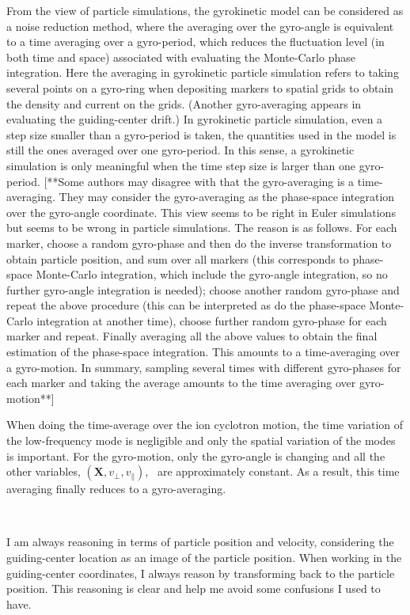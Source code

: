\documentclass{article}
\begin{document}
From the view of particle simulations, the gyrokinetic model can be
considered as a noise reduction method, where the averaging over the
gyro-angle is equivalent to a time averaging over a gyro-period, which reduces
the fluctuation level (in both time and space) associated with evaluating the
Monte-Carlo phase integration. Here the averaging in gyrokinetic particle
simulation refers to taking several points on a gyro-ring when depositing
markers to spatial grids to obtain the density and current on the grids.
(Another gyro-averaging appears in evaluating the guiding-center drift.) In
gyrokinetic particle simulation, even a step size smaller than a gyro-period
is taken, the quantities used in the model is still the ones averaged over one
gyro-period. In this sense, a gyrokinetic simulation is only meaningful when
the time step size is larger than one gyro-period. [**Some authors may
disagree with that the gyro-averaging is a time-averaging. They may consider
the gyro-averaging as the phase-space integration over the gyro-angle
coordinate. This view seems to be right in Euler simulations but seems to be
wrong in particle simulations. The reason is as follows. For each marker,
choose a random gyro-phase and then do the inverse transformation to obtain
particle position, and sum over all markers (this corresponds to phase-space
Monte-Carlo integration, which include the gyro-angle integration, so no
further gyro-angle integration is needed); choose another random gyro-phase
and repeat the above procedure (this can be interpreted as do the phase-space
Monte-Carlo integration at another time), choose further random gyro-phase for
each marker and repeat. Finally averaging all the above values to obtain the
final estimation of the phase-space integration. This amounts to a
time-averaging over a gyro-motion. In summary, sampling several times with
different gyro-phases for each marker and taking the average amounts to the
time averaging over gyro-motion**]

When doing the time-average over the ion cyclotron motion, the time variation
of the low-frequency mode is negligible and only the spatial variation of the
modes is important. For the gyro-motion, only the gyro-angle is changing and
all the other variables, $(\mathbf{X}, v_{\perp}, v_{\parallel})$, \ are
approximately constant. As a result, this time averaging finally reduces to a
gyro-averaging.

\

I am always reasoning in terms of particle position and velocity, considering
the guiding-center location as an image of the particle position. When working
in the guiding-center coordinates, I always reason by transforming back to the
particle position. This reasoning is clear and help me avoid some confusions I
used to have.
\end{document}
